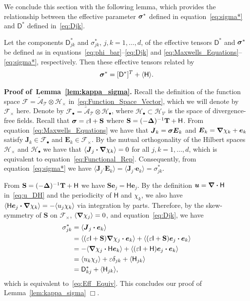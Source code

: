 \documentclass[leqno,onefignum,onetabnum]{siamltex1213}
\newcommand{\lemref}[1]{Lemma~\ref{#1}}
\newcommand{\Tb}{\mathbf{T}}
\newcommand{\Sb}{\mathbf{S}}
\newcommand{\Tc}{\mathcal{T}}
\newcommand{\Vc}{\mathcal{V}}
\newcommand{\Hc}{\mathcal{H}}
\newcommand{\Fc}{\mathcal{F}}
\newcommand{\Ac}{\mathcal{A}}
\newcommand{\Dm}{\mathsf{D}}
\newcommand{\Hm}{\mathsf{H}}
\newcommand{\Ib}{\mathsf{I}}
\newcommand\bsig{\mbox{\boldmath${\sigma}$}}
\newcommand\bDelta{\mbox{\boldmath${\Delta}$}}
\newcommand\bnabla{\mbox{\boldmath${\nabla}$}}
\providecommand\bcdot{\boldsymbol{\cdot}}
\newcommand{\vecJ}{\boldsymbol{J}}
\newcommand{\vecE}{\boldsymbol{E}}
\newcommand{\vecu}{\boldsymbol{u}}
\newcommand{\vece}{\boldsymbol{e}}
\begin{document}
We conclude this section with the following lemma, which provides
the relationship between the effective parameter $\bsig^*$ defined in
equation~\eqref{eq:sigma*} and $\Dm^*$ defined in~\eqref{eq:Djk}.
%
\begin{lemma}\label{lem:kappa_sigma}
%
Let the components $\Dm^*_{jk}$ and $\sigma^*_{jk}$, $j,k=1,\ldots,d$, of the
effective tensors $\Dm^*$ and $\bsig^*$ be defined as in
equations~\eqref{eq:phi_bar}--\eqref{eq:Djk} and
\eqref{eq:Maxwells_Equations}--\eqref{eq:sigma*}, respectively. Then  
these effective tensors related by 
% 
\begin{align}\label{eq:Eff_Equiv}
  \bsig^*=[\Dm^*]^T+\langle\Hm\rangle.
\end{align}
%
\end{lemma}
%
%
\textbf{Proof of~\lemref{lem:kappa_sigma}.}\hspace{1ex}
%
Recall the definition of the function space
$\Fc=\tilde{\Ac}_{\Tc}\otimes\Hc_\times$ in~\eqref{eq:Function_Space_Vector},
which we will denote by $\Fc_\times$ here. Denote by
$\Fc_\bullet=\tilde{\Ac}_{\Tc}\otimes\Hc_\bullet$, where $\Hc_\bullet\subset\Hc_{\Vc}$ is the space
of divergence-free fields. Recall that $\bsig=\varepsilon\Ib+\Sb$ where
$\Sb=(-\bDelta)^{-1}\Tb+\Hm$.  From equation~\eqref{eq:Maxwells_Equations} we
have that $\vecJ_k=\bsig\vecE_k$ and $\vecE_k=\bnabla \chi_k+\vece_k$
satisfy $\vecJ_k\in\Fc_\bullet$ and $\vecE_k\in\Fc_\times$. By the mutual
orthogonality of the Hilbert spaces $\Hc_\times$ and $\Hc_\bullet$ we have that
$\langle\vecJ_j\bcdot\bnabla \chi_k\rangle=0$ for all $j,k=1,\ldots,d$, which is
equivalent to equation~\eqref{eq:Functional_Rep}. Consequently, from
equation~\eqref{eq:sigma*} we have
$\langle\vecJ_j\bcdot\vecE_k\rangle=\langle\vecJ_j\bcdot\vece_k\rangle=\sigma^*_{jk}$.


From $\Sb=(-\bDelta)^{-1}\Tb+\Hm$ we have
$\Sb\vece_j=\Hm\vece_j$. By the definition $\vecu =\bnabla \bcdot\Hm$
in~\eqref{eq:u_DH} and the periodicity of $\Hm$ and $\chi_k$, we also
have 
$\langle\Hm\vece_j\bcdot\bnabla \chi_k\rangle=-\langle u_j\chi_k\rangle$ via integration by
parts. Therefore, by the skew-symmetry of $\Sb$ on $\Fc_\times$,
$\langle\bnabla\chi_j\rangle=0$, and equation~\eqref{eq:Djk}, we have 
%
\begin{align}
  \sigma^*_{jk}&=\langle\vecJ_j\bcdot\vece_k\rangle
      \\\notag
      &=\langle(\varepsilon\Ib+\Sb)\bnabla\chi_j\bcdot\vece_k\rangle
      +\langle(\varepsilon\Ib+\Sb)\vece_j\bcdot\vece_k\rangle
      \\\notag
      &=-\langle\bnabla\chi_j\bcdot\Hm\vece_k\rangle
      +\langle(\varepsilon\Ib+\Hm)\vece_j\bcdot\vece_k\rangle
      \\\notag
      &=\langle u_k\chi_j\rangle+\varepsilon\delta_{jk}+\langle\Hm_{jk}\rangle
      \\\notag
      &=\Dm^*_{kj}+\langle\Hm_{jk}\rangle,
\end{align}
%
which is equivalent to~\eqref{eq:Eff_Equiv}. This concludes
our proof of \lemref{lem:kappa_sigma} $\Box$.     
\end{document}
